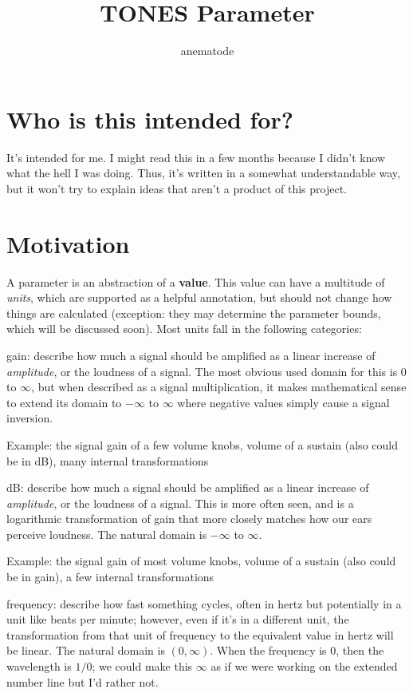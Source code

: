 \documentclass{article}
\begin{document}
\title{TONES Parameter}

\author{anematode}

\maketitle

\section{Who is this intended for?}

It's intended for me. I might read this in a few months because I didn't know what the hell I was doing. Thus, it's written in a somewhat understandable way, but it won't try to explain ideas that aren't a product of this project.

\section{Motivation}

A parameter is an abstraction of a \textbf{value}. This value can have a multitude of \textit{units}, which are supported as a helpful annotation, but should not change how things are calculated (exception: they may determine the parameter bounds, which will be discussed soon). Most units fall in the following categories:

gain: describe how much a signal should be amplified as a linear increase of \textit{amplitude}, or the loudness of a signal. The most obvious used domain for this is 0 to $\infty$, but when described as a signal multiplication, it makes mathematical sense to extend its domain to $-\infty$ to $\infty$ where negative values simply cause a signal inversion.

Example: the signal gain of a few volume knobs, volume of a sustain (also could be in dB), many internal transformations

dB: describe how much a signal should be amplified as a linear increase of \textit{amplitude}, or the loudness of a signal. This is more often seen, and is a logarithmic transformation of gain that more closely matches how our ears perceive loudness. The natural domain is $-\infty$ to $\infty$.

Example: the signal gain of most volume knobs, volume of a sustain (also could be in gain), a few internal transformations

frequency: describe how fast something cycles, often in hertz but potentially in a unit like beats per minute; however, even if it's in a different unit, the transformation from that unit of frequency to the equivalent value in hertz will be linear. The natural domain is $(0, \infty)$. When the frequency is $0$, then the wavelength is $1/0$; we could make this $\infty$ as if we were working on the extended number line but I'd rather not.
\end{document}
